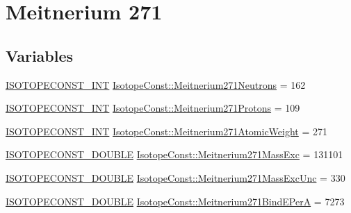 \hypertarget{group___isotope_const-_meitnerium-_mt271}{}\section{Meitnerium 271}
\label{group___isotope_const-_meitnerium-_mt271}
\subsection*{Variables}
\begin{DoxyCompactItemize}
\item 
\mbox{\hyperlink{group___isotope_const-_macros_ga5f18360b3e99483a35c32d789e62621c}{I\+S\+O\+T\+O\+P\+E\+C\+O\+N\+S\+T\+\_\+\+I\+NT}} \mbox{\hyperlink{group___isotope_const-_meitnerium-_mt271_gad5737a236ddab7892fe8d92ce952f577}{Isotope\+Const\+::\+Meitnerium271\+Neutrons}} = 162
\item 
\mbox{\hyperlink{group___isotope_const-_macros_ga5f18360b3e99483a35c32d789e62621c}{I\+S\+O\+T\+O\+P\+E\+C\+O\+N\+S\+T\+\_\+\+I\+NT}} \mbox{\hyperlink{group___isotope_const-_meitnerium-_mt271_ga40a63f3d943d7868852514bc4ef82542}{Isotope\+Const\+::\+Meitnerium271\+Protons}} = 109
\item 
\mbox{\hyperlink{group___isotope_const-_macros_ga5f18360b3e99483a35c32d789e62621c}{I\+S\+O\+T\+O\+P\+E\+C\+O\+N\+S\+T\+\_\+\+I\+NT}} \mbox{\hyperlink{group___isotope_const-_meitnerium-_mt271_ga18cd88b93f7f2c36ce992b8325288525}{Isotope\+Const\+::\+Meitnerium271\+Atomic\+Weight}} = 271
\item 
\mbox{\hyperlink{group___isotope_const-_macros_ga8f45a7272ce02c0b4c65c44636ed719a}{I\+S\+O\+T\+O\+P\+E\+C\+O\+N\+S\+T\+\_\+\+D\+O\+U\+B\+LE}} \mbox{\hyperlink{group___isotope_const-_meitnerium-_mt271_gabb30ffde2ec1dcb153eff243ec81fb1a}{Isotope\+Const\+::\+Meitnerium271\+Mass\+Exc}} = 131101
\item 
\mbox{\hyperlink{group___isotope_const-_macros_ga8f45a7272ce02c0b4c65c44636ed719a}{I\+S\+O\+T\+O\+P\+E\+C\+O\+N\+S\+T\+\_\+\+D\+O\+U\+B\+LE}} \mbox{\hyperlink{group___isotope_const-_meitnerium-_mt271_gaeb3e686b0f61ef48c438284ff5620b38}{Isotope\+Const\+::\+Meitnerium271\+Mass\+Exc\+Unc}} = 330
\item 
\mbox{\hyperlink{group___isotope_const-_macros_ga8f45a7272ce02c0b4c65c44636ed719a}{I\+S\+O\+T\+O\+P\+E\+C\+O\+N\+S\+T\+\_\+\+D\+O\+U\+B\+LE}} \mbox{\hyperlink{group___isotope_const-_meitnerium-_mt271_ga3e702aa0035aa4eec5ebd7353d0d01fe}{Isotope\+Const\+::\+Meitnerium271\+Bind\+E\+PerA}} = 7273
\item 

\end{DoxyCompactItemize}

